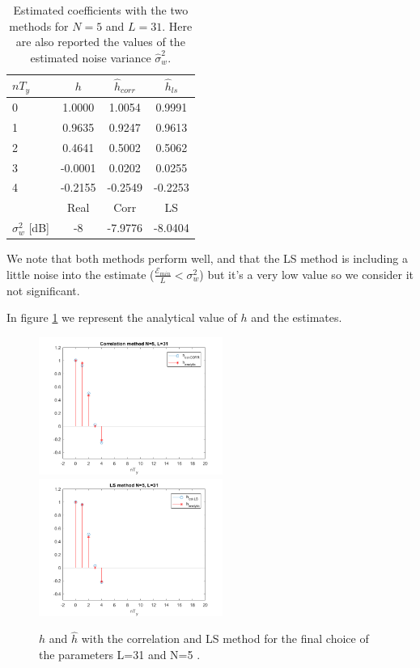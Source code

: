 \documentclass[a4paper,11.5pt]{article}
\begin{document}
\begin{table}[htbp]
	\begin{center}
		\begin{tabular}{p{2.7cm}ccc}
			\toprule
			
			$nT_y$ & $h$ & $\hat{h}_{corr}$ & $\hat{h}_{ls}$\\
			\midrule
			0 & 1.0000  & 1.0054 & 0.9991  \\
			1 & 0.9635 & 0.9247 & 0.9613  \\
			2 & 0.4641 & 0.5002 & 0.5062 \\
			3 & -0.0001 & 0.0202 & 0.0255  \\
			4 & -0.2155 & -0.2549 & -0.2253\\
			\midrule
			& Real & Corr & LS \\
		    \cmidrule(lr){2-4}
		    $\sigma_w^2$ [dB] & -8 & -7.9776 & -8.0404  \\
			\bottomrule
		\end{tabular}
	\end{center}
	\label{tab:coeff}
	\caption{Estimated coefficients with the two methods for $N=5$ and $L=31$. Here are also reported the values of the estimated noise variance $\hat{\sigma}_w^2$.}
\end{table} 

\noindent We note that both methods perform well, and that the LS method is including a little noise into the estimate ($\frac{\mathcal{E}_{min}}{L}<\sigma_w^2$) but it's a very low value so we consider it not significant.

In figure \ref{fig:hest} we represent the analytical value of $h$ and the estimates.

\begin{figure}[ht]
	\begin{center}    
		\includegraphics[width=6cm]{figs/corrN5L31.png}
		\includegraphics[width=6cm]{figs/lsN5L31.png}
		\caption{$h$ and $\hat{h}$ with the correlation and LS method for the final choice of the parameters L=31 and N=5 .}
		\label{fig:hest}
	\end{center}
\end{figure} 
 
\end{document}
